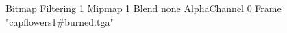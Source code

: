 {Bitmap
	{Filtering 1}
	{Mipmap 1}
	{Blend none}
	{AlphaChannel 0}
	{Frame "capflowers1#burned.tga"}
}
